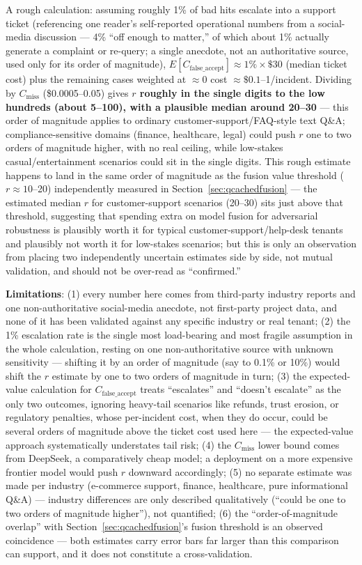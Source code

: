\documentclass[11pt]{article}
\begin{document}
A rough calculation: assuming roughly 1\% of bad hits escalate into a support ticket (referencing one reader's self-reported operational numbers from a social-media discussion --- 4\% ``off enough to matter,'' of which about 1\% actually generate a complaint or re-query; a single anecdote, not an authoritative source, used only for its order of magnitude), $E[C_{\text{false\_accept}}] \approx 1\% \times \$30$ (median ticket cost) plus the remaining cases weighted at $\approx 0$ cost $\approx \$0.1$--1/incident. Dividing by $C_{\text{miss}}$ (\$0.0005--0.05) gives \textbf{$r$ roughly in the single digits to the low hundreds (about 5--100), with a plausible median around 20--30} --- this order of magnitude applies to ordinary customer-support/FAQ-style text Q\&A; compliance-sensitive domains (finance, healthcare, legal) could push $r$ one to two orders of magnitude higher, with no real ceiling, while low-stakes casual/entertainment scenarios could sit in the single digits. This rough estimate happens to land in the same order of magnitude as the fusion value threshold ($r\approx10$--20) independently measured in Section~\ref{sec:qcachedfusion} --- the estimated median $r$ for customer-support scenarios (20--30) sits just above that threshold, suggesting that spending extra on model fusion for adversarial robustness is plausibly worth it for typical customer-support/help-desk tenants and plausibly not worth it for low-stakes scenarios; but this is only an observation from placing two independently uncertain estimates side by side, not mutual validation, and should not be over-read as ``confirmed.''

\textbf{Limitations}: (1) every number here comes from third-party industry reports and one non-authoritative social-media anecdote, not first-party project data, and none of it has been validated against any specific industry or real tenant; (2) the 1\% escalation rate is the single most load-bearing and most fragile assumption in the whole calculation, resting on one non-authoritative source with unknown sensitivity --- shifting it by an order of magnitude (say to 0.1\% or 10\%) would shift the $r$ estimate by one to two orders of magnitude in turn; (3) the expected-value calculation for $C_{\text{false\_accept}}$ treats ``escalates'' and ``doesn't escalate'' as the only two outcomes, ignoring heavy-tail scenarios like refunds, trust erosion, or regulatory penalties, whose per-incident cost, when they do occur, could be several orders of magnitude above the ticket cost used here --- the expected-value approach systematically understates tail risk; (4) the $C_{\text{miss}}$ lower bound comes from DeepSeek, a comparatively cheap model; a deployment on a more expensive frontier model would push $r$ downward accordingly; (5) no separate estimate was made per industry (e-commerce support, finance, healthcare, pure informational Q\&A) --- industry differences are only described qualitatively (``could be one to two orders of magnitude higher''), not quantified; (6) the ``order-of-magnitude overlap'' with Section~\ref{sec:qcachedfusion}'s fusion threshold is an observed coincidence --- both estimates carry error bars far larger than this comparison can support, and it does not constitute a cross-validation.
\end{document}
